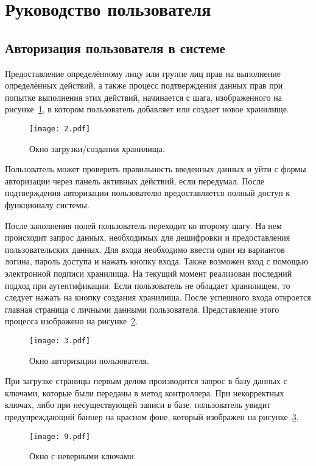\section{Руководство пользователя}
\label{sec:document}

\subsection{Авторизация пользователя в системе}
\label{sec:document:auth}

Предоставление определённому лицу или группе лиц прав на выполнение определённых действий, а также процесс подтверждения данных прав при попытке выполнения этих действий, начинается с шага, изображенного на рисунке~\ref{fig:document:auth:two}, в котором пользователь добавляет или создает новое хранилище.

\begin{figure}[ht]
\centering
  \texttt{[image: 2.pdf]}
  \caption{ Окно загрузки/создания хранилища. }
  \label{fig:document:auth:two}
\end{figure}

Пользователь может проверить правильность введенных данных и уйти с формы авторизации через панель активных действий, если передумал. После подтверждения авторизации пользователю предоставляется полный доступ к функционалу системы.

После заполнения полей пользователь переходит ко второму шагу. На нем происходит запрос данных, необходимых для дешифровки и предоставления пользовательских данных. Для входа необходимо ввести один из вариантов логина, пароль доступа и нажать кнопку входа. Также
возможен вход с помощью электронной подписи хранилища. На текущий момент реализован последний подход при аутентификации. Если
пользователь не обладает хранилищем, то следует нажать на кнопку создания хранилища.
После успешного входа откроется главная страница с личными данными пользователя. Представление этого процесса изображено на рисунке~\ref{fig:document:auth:therd}.
\begin{figure}[ht]
\centering
  \texttt{[image: 3.pdf]}
  \caption{ Окно авторизации пользователя. }
  \label{fig:document:auth:therd}
\end{figure}
\newpage
При загрузке страницы первым делом производится запрос в базу данных с ключами, которые были переданы в метод контроллера. При некорректных ключах, либо при несуществующей записи в базе, пользователь увидит предупреждающий баннер на красном фоне, который изображен на рисунке~\ref{fig:document:auth:nein}.
\begin{figure}[ht]
\centering
  \texttt{[image: 9.pdf]}
  \caption{ Окно с неверными ключами. }
  \label{fig:document:auth:nein}
\end{figure}

